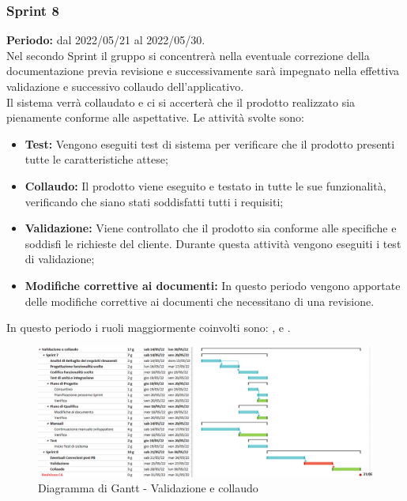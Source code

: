 \subsubsection{Sprint 8} \label{subsubsection:sprint_8}
\textbf{Periodo:} dal 2022/05/21 al 2022/05/30.
\bigskip
\\Nel secondo Sprint\glo{} il gruppo si concentrerà nella eventuale correzione della documentazione previa revisione e successivamente sarà impegnato nella effettiva validazione e successivo collaudo dell'applicativo.
\\Il sistema verrà collaudato e ci si accerterà che il prodotto realizzato sia pienamente conforme alle aspettative.
Le attività svolte sono:
\begin{itemize}
  \item \textbf{Test:} Vengono eseguiti test di sistema per verificare che il prodotto presenti tutte le caratteristiche attese;
  \item \textbf{Collaudo:} Il prodotto viene eseguito e testato in tutte le sue funzionalità, verificando che siano stati soddisfatti tutti i requisiti;
  \item \textbf{Validazione:} Viene controllato che il prodotto sia conforme alle specifiche e soddisfi le richieste del cliente.
        Durante questa attività vengono eseguiti i test di validazione;
  \item \textbf{Modifiche correttive ai documenti:} In questo periodo vengono apportate delle modifiche correttive ai documenti che necessitano di una revisione.
\end{itemize}
In questo periodo i ruoli maggiormente coinvolti sono: \roleDesignerLow{}, \roleProgrammerLow{} e \roleVerifierLow{}.
\bigskip
\begin{figure}[H]
  \centering
  \includegraphics[scale=0.55]{immagini/validazione_collaudo.png}
  \caption{Diagramma di Gantt - Validazione e collaudo}
\end{figure}
\pagebreak